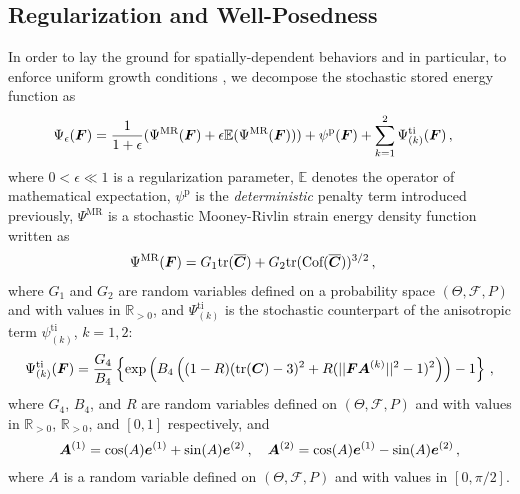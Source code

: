 \subsection{Regularization and Well-Posedness}\label{subsec:regularization}

In order to lay the ground for spatially-dependent behaviors and in particular, to enforce uniform growth conditions \cite{STABER201894}, we decompose the stochastic stored energy function as
\begin{align}
    \Psi_{\epsilon}(\boldsymbol{F}) & = \frac{1}{1+\epsilon}( \Psi^{\text{MR}}(\boldsymbol{F}) + \epsilon \mathbb{E}(\Psi^{\text{MR}}(\boldsymbol{F}))) + \psi^\text{p}(\boldsymbol{F}) + \sum_{k=1}^{2} \Psi_{(k)}^\text{ti}(\boldsymbol{F})\,,\label{eq:regularized-SEF-homogeneous}
\end{align}
where $0 < \epsilon \ll 1$ is a regularization parameter, $\mathbb{E}$ denotes the operator of mathematical expectation, $\psi^\text{p}$ is the \textit{deterministic} penalty term introduced previously, $\Psi^{\text{MR}}$ is a stochastic Mooney-Rivlin strain energy density function written as
\begin{align}
    \Psi^{\text{MR}}(\boldsymbol{F}) &= G_1 \textnormal{tr}(\overline{\boldsymbol{C}}) + G_2 \textnormal{tr}(\text{Cof}(\overline{\boldsymbol{C}}))^{3/2}\,, \label{eq: MR-Sto} 
\end{align}
where $G_1$ and $G_2$ are random variables defined on a probability space $(\Theta, \mathcal{F}, P)$ and with values in $\mathbb{R}_{> 0}$, and $\Psi_{(k)}^\text{ti}$ is the stochastic counterpart of the anisotropic term $\psi_{(k)}^\text{ti}$, $k = 1,2$:
\begin{align}
    \Psi_{(k)}^\text{ti}(\boldsymbol{F}) = \frac{G_4}{B_4} \left\{ \exp \left(B_4 \left( (1-R)(\textnormal{tr}(\boldsymbol{C})-3)^2 + R ( \vert \vert \boldsymbol{F} \boldsymbol{A}^{(k)} \vert \vert ^2 - 1 )^2 \right) \right) - 1\right\}\,, \label{eq: psi tissue-Sto}
\end{align}  
where $G_4$, $B_4$, and $R$ are random variables defined on $(\Theta, \mathcal{F}, P)$ and with values in $\mathbb{R}_{> 0}$, $\mathbb{R}_{> 0}$, and $[0,1]$ respectively, and 
\begin{equation}    
    \boldsymbol{A}^{(1)} = \cos(A) \boldsymbol{e}^{(1)} + \sin(A)\boldsymbol{e}^{(2)}\,, \quad \boldsymbol{A}^{(2)} = \cos(A) \boldsymbol{e}^{(1)} - \sin(A)\boldsymbol{e}^{(2)}\,,
\end{equation}
where $A$ is a random variable defined on $(\Theta, \mathcal{F}, P)$ and with values in $[0, \pi/2]$. 

